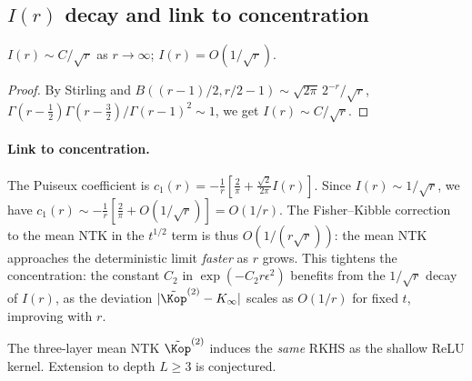 \subsection{\( I(r) \) decay and link to concentration}

\begin{proposition}\label{prop:I-r-scaling}
\( I(r) \sim C/\sqrt{r} \) as \( r\to\infty \); \( I(r) = O(1/\sqrt{r}) \).
\end{proposition}
\begin{proof}
By Stirling and \( B((r-1)/2, r/2-1) \sim \sqrt{2\pi}\,2^{-r}/\sqrt{r} \), \( \Gamma(r-\tfrac{1}{2})\Gamma(r-\tfrac{3}{2})/\Gamma(r-1)^2 \sim 1 \), we get \( I(r) \sim C/\sqrt{r} \).
\end{proof}

\paragraph{Link to concentration.} The Puiseux coefficient is \( c_1(r) = -\frac{1}{r}[\frac{2}{\pi} + \frac{\sqrt{2}}{2\pi}I(r)] \). Since \( I(r) \sim 1/\sqrt{r} \), we have \( c_1(r) \sim -\frac{1}{r}[\frac{2}{\pi} + O(1/\sqrt{r})] = O(1/r) \). The Fisher--Kibble correction to the mean NTK in the \( t^{1/2} \) term is thus \( O(1/(r\sqrt{r})) \): the mean NTK approaches the deterministic limit \emph{faster} as \( r \) grows. This tightens the concentration: the constant \( C_2 \) in \( \exp(-C_2 r\epsilon^2) \) benefits from the \( 1/\sqrt{r} \) decay of \( I(r) \), as the deviation \( |\tilde{\Kop}^{(2)} - K_\infty| \) scales as \( O(1/r) \) for fixed \( t \), improving with \( r \).

\begin{corollary}\label{cor:conditional_rkhs_homogeneous}
The three-layer mean NTK \( \tilde{\Kop}^{(2)} \) induces the \emph{same} RKHS as the shallow ReLU kernel. Extension to depth \( L \ge 3 \) is conjectured.
\end{corollary}
